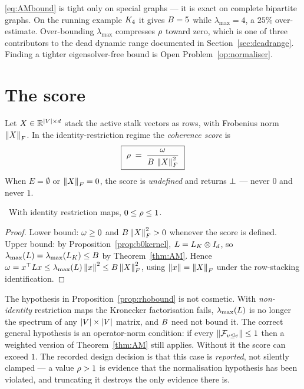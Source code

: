 \begin{remark}
\eqref{eq:AMbound} is tight only on special graphs --- it is exact on
complete bipartite graphs. On the running example $K_4$ it gives
$B=5$ while $\lambda_{\max}=4$, a $25\%$ over-estimate. Over-bounding
$\lambda_{\max}$ compresses $\rho$ toward zero, which is one of
three contributors to the dead dynamic range documented in
Section~\ref{sec:deadrange}. Finding a tighter eigensolver-free bound is
Open Problem~\ref{op:normaliser}.
\end{remark}

\section{The score}

\begin{definition}\label{def:rho}
Let $X\in\mathbb{R}^{\left\lvert V \right\rvert\times d}$ stack the active stalk vectors as rows,
with Frobenius norm $\left\lVert X \right\rVert_F$. In the identity-restriction regime the
\emph{coherence score} is
\begin{equation}\label{eq:rho}
  \boxed{\ \rho\;=\;\frac{\omega}{B\,\left\lVert X \right\rVert_F^2}\ }
\end{equation}
When $E=\emptyset$ or $\left\lVert X \right\rVert_F=0$, the score is \emph{undefined} and
returns $\bot$ --- never $0$ and never $1$.
\end{definition}

\begin{proposition}[{$\rhoscore\in[0,1]$}]\label{prop:rhobound}
\ProvedCond\ With identity restriction maps, $0\le\rho\le1$.
\end{proposition}
\begin{proof}
Lower bound: $\omega\ge0$ and $B\left\lVert X \right\rVert_F^2>0$ whenever the score
is defined. Upper bound: by Proposition~\ref{prop:b0kernel},
$L=L_K\otimes I_d$, so
$\lambda_{\max}(L)=\lambda_{\max}(L_K)\le B$ by
Theorem~\ref{thm:AM}. Hence
$\omega=x^\top L x\le\lambda_{\max}(L)\left\lVert x \right\rVert^2\le B\left\lVert X \right\rVert_F^2$,
using $\left\lVert x \right\rVert=\left\lVert X \right\rVert_F$ under the row-stacking identification.
\end{proof}

\begin{hon}\Hon
The hypothesis in Proposition~\ref{prop:rhobound} is not cosmetic. With
\emph{non-identity} restriction maps the Kronecker factorisation fails,
$\lambda_{\max}(L)$ is no longer the spectrum of any
$\left\lvert V \right\rvert\times\left\lvert V \right\rvert$ matrix, and $B$ need not bound it. The correct
general hypothesis is an operator-norm condition: if every
$\left\lVert \mathcal{F}_{v\trianglelefteq e} \right\rVert\le1$ then a weighted version of
Theorem~\ref{thm:AM} still applies. Without it the score can exceed $1$.
The recorded design decision is that this case is \emph{reported}, not
silently clamped --- a value $\rho>1$ is evidence that the
normalisation hypothesis has been violated, and truncating it destroys
the only evidence there is.
\end{hon}

